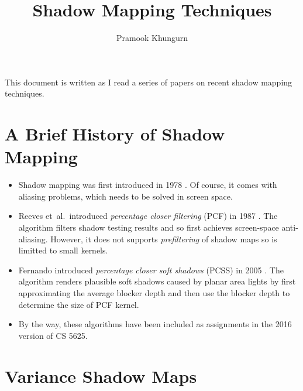 \documentclass[10pt]{article}
\title{Shadow Mapping Techniques}
\author{Pramook Khungurn}
\newcommand{\etal}{{et~al.}}
\begin{document}
  \maketitle

  This document is written as I read a series of papers on recent shadow mapping techniques.  

  \section{A Brief History of Shadow Mapping}

  \begin{itemize}
  	\item Shadow mapping was first introduced in 1978 \cite{Williams:1978}.  Of course, it comes with aliasing problems, which needs to be solved in screen space.

  	\item Reeves \etal\ introduced \emph{percentage closer filtering} (PCF) in 1987 \cite{Reeves:1987}.  The algorithm filters shadow testing results and so first achieves screen-space anti-aliasing.  However, it does not supports \emph{prefiltering} of shadow maps so is limitted to small kernels.

  	\item Fernando introduced \emph{percentage closer soft shadows} (PCSS) in 2005 \cite{Fernando:2005}.  The algorithm renders plausible soft shadows caused by planar area lights by first approximating the average blocker depth and then use the blocker depth to determine the size of PCF kernel.

  	\item By the way, these algorithms have been included as assignments in the 2016 version of CS 5625.
  \end{itemize}

  \section{Variance Shadow Maps}
\end{document}
